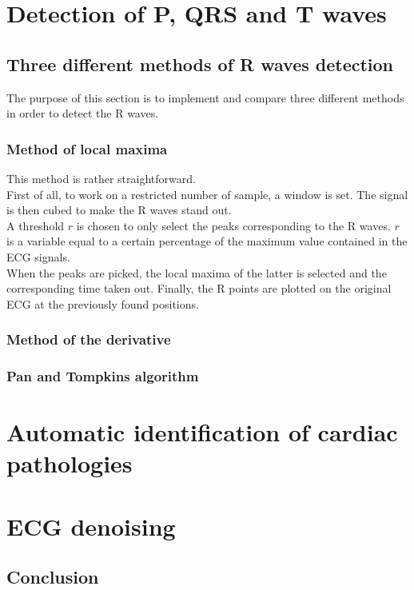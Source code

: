 \documentclass[11pt]{report}
\begin{document}
\chapter{Detection of P, QRS and T waves}
	\section{Three different methods of R waves detection}
		The purpose of this section is to implement and compare three different methods in order to detect the R waves.
		\subsection{Method of local maxima}
			This method is rather straightforward. \\
			First of all, to work on a restricted number of sample, a window is set. The signal is then cubed to make the R waves stand out.\\
			A threshold $r$ is chosen to only select the peaks corresponding to the R waves. $r$ is a variable equal to a certain percentage of the maximum value contained in the ECG signals.\\
			When the peaks are picked, the local maxima of the latter is selected and the corresponding time taken out. Finally, the R points are plotted on the original ECG at the previously found positions.
		\subsection{Method of the derivative}
		\subsection{Pan and Tompkins algorithm}



\chapter{Automatic identification of cardiac pathologies}

\chapter{ECG denoising}


\newpage
\section*{Conclusion}
\end{document}

